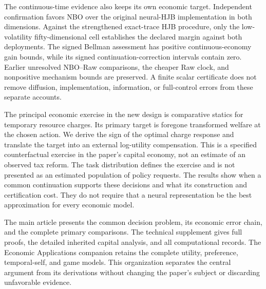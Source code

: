 The continuous-time evidence also keeps its own economic target. Independent
confirmation favors NBO over the original neural-HJB implementation in both
dimensions. Against the strengthened exact-trace HJB procedure, only the
low-volatility fifty-dimensional cell establishes the declared margin against
both deployments. The signed Bellman assessment has positive continuous-economy
gain bounds, while its signed continuation-correction intervals contain zero.
Earlier unresolved NBO--Raw comparisons, the cheaper Raw clock, and
nonpositive mechanism bounds are preserved. A finite scalar certificate does
not remove diffusion, implementation, information, or full-control errors
from these separate accounts.

The principal economic exercise in the new design is comparative statics
for temporary resource charges. Its primary target is foregone transformed
welfare at the chosen action. We derive the sign of the optimal charge
response and translate the target into an external log-utility compensation.
This is a specified counterfactual exercise in the paper's capital economy,
not an estimate of an observed tax reform. The task distribution defines the
exercise and is not presented as an estimated population of policy requests.
The results show when a common continuation supports these decisions and
what its construction and certification cost. They do not require that a
neural representation be the best approximation for every economic model.

The main article presents the common decision problem, its economic error
chain, and the complete primary comparisons. The technical supplement gives
full proofs, the detailed inherited capital analysis, and all computational
records. The Economic Applications companion retains the complete utility,
preference, temporal-self, and game models. This organization separates the
central argument from its derivations without changing the paper's subject
or discarding unfavorable evidence.
